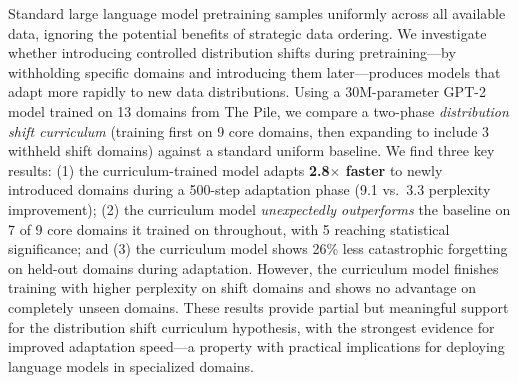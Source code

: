 Standard large language model pretraining samples uniformly across all available data, ignoring the potential benefits of strategic data ordering. We investigate whether introducing controlled distribution shifts during pretraining---by withholding specific domains and introducing them later---produces models that adapt more rapidly to new data distributions. Using a 30M-parameter GPT-2 model trained on 13 domains from The Pile, we compare a two-phase \emph{distribution shift curriculum} (training first on 9 core domains, then expanding to include 3 withheld shift domains) against a standard uniform baseline. We find three key results: (1) the curriculum-trained model adapts \textbf{2.8$\times$ faster} to newly introduced domains during a 500-step adaptation phase (9.1 vs.\ 3.3 perplexity improvement); (2) the curriculum model \emph{unexpectedly outperforms} the baseline on 7 of 9 core domains it trained on throughout, with 5 reaching statistical significance; and (3) the curriculum model shows 26\% less catastrophic forgetting on held-out domains during adaptation. However, the curriculum model finishes training with higher perplexity on shift domains and shows no advantage on completely unseen domains. These results provide partial but meaningful support for the distribution shift curriculum hypothesis, with the strongest evidence for improved adaptation speed---a property with practical implications for deploying language models in specialized domains.
